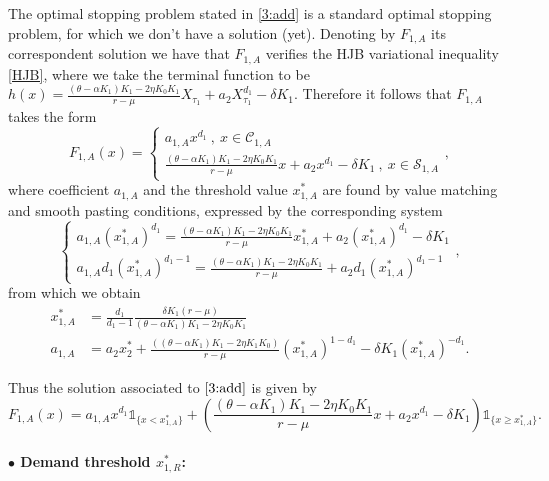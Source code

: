 The optimal stopping problem stated in \eqref{3:add} is a standard optimal stopping problem, for which we don't have a solution (yet).
Denoting by $F_{1,A}$ its correspondent solution we have that $F_{1,A}$ verifies the HJB variational inequality \eqref{HJB}, where we take the terminal function to be $h(x)=\frac{(\theta-\alpha K_1)K_1-2 \eta K_0 K_1}{r-\mu} X_{\tau_1}+
a_2 X_{\tau_1}^{d_1} - \delta K_1$. Therefore it follows that $F_{1,A}$ takes the form
\begin{equation}
F_{1,A}(x)=\begin{cases} a_{1,A} x^{d_1}  \ , \ x \in \mathcal{C}_{1,A} \\
\frac{(\theta-\alpha K_1)K_1-2 \eta K_0 K_1}{r-\mu} x+
a_2 x^{d_1} - \delta K_1 \ , \ x \in \mathcal{S}_{1,A}
\end{cases},
\label{3_F1A}
\end{equation}
where coefficient $a_{1,A}$ and the threshold value $x_{1,A}^*$ are found by value matching and smooth pasting conditions, expressed by the corresponding system
\begin{equation}
\begin{cases} a_{1,A} (x_{1,A}^*)^{d_1}=\frac{(\theta-\alpha K_1)K_1-2 \eta K_0 K_1}{r-\mu} x_{1,A}^*+
a_2 (x_{1,A}^*)^{d_1} - \delta K_1\\
a_{1,A} d_1(x_{1,A}^*)^{d_1-1}=\frac{(\theta-\alpha K_1)K_1-2 \eta K_0 K_1}{r-\mu}+
a_2 d_1 (x_{1,A}^*)^{d_1-1}
\end{cases},
\label{eq:3_sistema}
\end{equation}
from which we obtain
\begin{align}
x_{1,A}^*&=\frac{d_1}{d_1-1} \frac{\delta K_1 (r-\mu )}{ (\theta -\alpha  K_1)K_1-2 \eta  K_0 K_1} \label{eq:3_x1A}\\
a_{1,A}&=
a_2 x^*_2+\frac{((\theta -\alpha  K_1)K_1-2 \eta  K_1 K_0) }{r-\mu }(x_{1,A}^*)^{1-d_1}-\delta K_1 (x_{1,A}^*)^{-d_1}. 
\end{align}

Thus the solution associated to $\eqref{3:add}$ is given by 
\begin{equation}
F_{1,A}(x)= a_{1,A}x^{d_1} \mathds{1}_{ \{ x<x^*_{1,A}\}} +
\left(  \frac{(\theta-\alpha K_1)K_1-2 \eta K_0 K_1}{r-\mu} x+
a_2 x^{d_1} - \delta K_1 \right)  \mathds{1}_{ \{ x \geq x^*_{1,A}\}}.
\label{3:Fadd}
\end{equation}
\\
\textbf{$\bullet$ Demand threshold $x^*_{1,R}$:}

